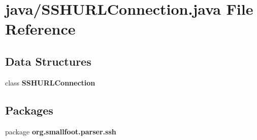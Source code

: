 \section{java/\+S\+S\+H\+U\+R\+L\+Connection.java File Reference}
\label{SSHURLConnection_8java}
\subsection*{Data Structures}
\begin{DoxyCompactItemize}
\item 
class {\bf S\+S\+H\+U\+R\+L\+Connection}
\end{DoxyCompactItemize}
\subsection*{Packages}
\begin{DoxyCompactItemize}
\item 
package {\bf org.\+smallfoot.\+parser.\+ssh}
\end{DoxyCompactItemize}
